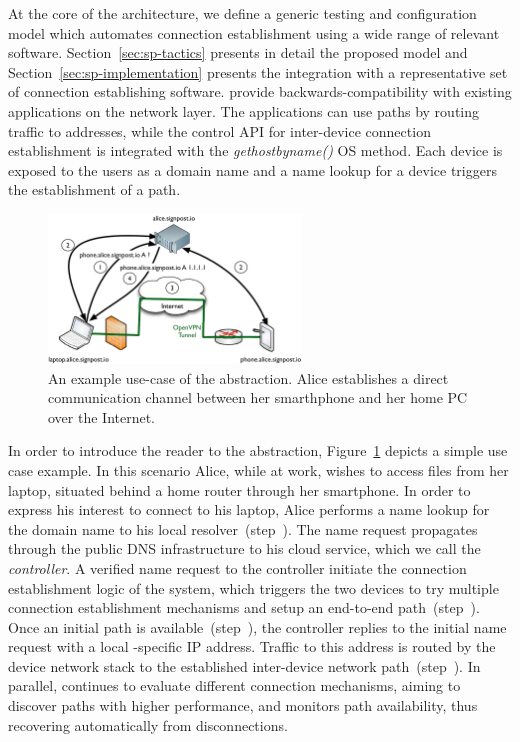 At the core of the \signpost architecture, we define a generic testing and
configuration model which automates connection establishment using a wide range
of relevant software. Section~\ref{sec:sp-tactics} presents in detail the
proposed model and Section~\ref{sec:sp-implementation} presents the integration
with a representative set of connection establishing software. \signpost provide
backwards-compatibility with existing applications on the network layer. The
applications can use \signpost paths by routing traffic to  \signpost addresses,
while the control API for inter-device connection establishment is integrated
with the \textit{gethostbyname()} OS method.  Each device is exposed to the
users as a domain name and a name lookup for a device triggers the establishment
of a \signpost path. 

\begin{figure}[ht]
  \begin{center}
	\includegraphics[width=0.6\textwidth]{Chapter3/Chapter3Figs/sp-illustration}
  \end{center}
  \caption[\signpost example use-case.]{An example use-case of the \signpost
    abstraction. Alice establishes a direct communication channel between 
    her smarthphone and her home PC over the Internet.}
  \label{fig:signpost-user-abstraction}
\end{figure}

In order to introduce the reader to the \signpost abstraction, 
Figure~\ref{fig:signpost-user-abstraction} depicts a simple use case example.  In this
scenario Alice, while at work, wishes to access
files from her laptop, situated behind a home router through her smartphone. In order to express
his interest to connect to his laptop, Alice performs a name lookup for the domain
name  to his local \signpost resolver~(step~).  The
name request propagates through the public DNS infrastructure to his \signpost
cloud service, which we call the {\it \signpost controller}. A verified name
request to the \signpost controller initiate the connection establishment logic
of the system, which triggers the two devices to try multiple connection
establishment mechanisms and setup an end-to-end path~(step~). Once an
initial path is available~(step~), the controller replies to the
initial name request with a local \signpost-specific IP address. Traffic to this
address is routed by the device network stack to the established inter-device
network path~(step~).  In parallel, \signpost continues to evaluate
different connection mechanisms, aiming to discover paths with higher
performance, and monitors path availability, thus recovering automatically
from disconnections. 


